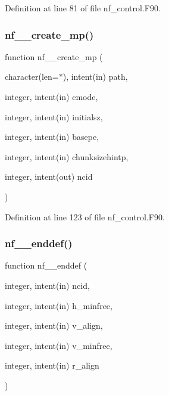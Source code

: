 Definition at line 81 of file nf\+\_\+control.\+F90.

\mbox{\label{nf__control_8F90_ac38934a3769782465f173347b8c49f25}} 
\subsubsection{\texorpdfstring{nf\+\_\+\+\_\+create\+\_\+mp()}{nf\_\_create\_mp()}}
{\footnotesize\ttfamily function nf\+\_\+\+\_\+create\+\_\+mp (\begin{DoxyParamCaption}\item[{character(len=$\ast$), intent(in)}]{path,  }\item[{integer, intent(in)}]{cmode,  }\item[{integer, intent(in)}]{initialsz,  }\item[{integer, intent(in)}]{basepe,  }\item[{integer, intent(in)}]{chunksizehintp,  }\item[{integer, intent(out)}]{ncid }\end{DoxyParamCaption})}



Definition at line 123 of file nf\+\_\+control.\+F90.

\mbox{\label{nf__control_8F90_a1db64050c9f96c2b53d8c18e13d6ad10}} 
\subsubsection{\texorpdfstring{nf\+\_\+\+\_\+enddef()}{nf\_\_enddef()}}
{\footnotesize\ttfamily function nf\+\_\+\+\_\+enddef (\begin{DoxyParamCaption}\item[{integer, intent(in)}]{ncid,  }\item[{integer, intent(in)}]{h\+\_\+minfree,  }\item[{integer, intent(in)}]{v\+\_\+align,  }\item[{integer, intent(in)}]{v\+\_\+minfree,  }\item[{integer, intent(in)}]{r\+\_\+align }\end{DoxyParamCaption})}



